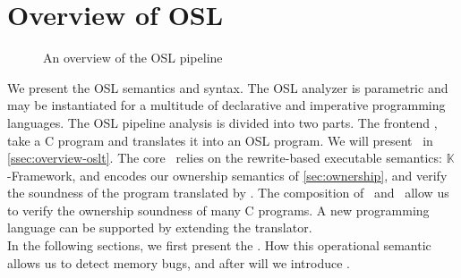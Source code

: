 \section{Overview of OSL}
\label{sec:osl-syntaxandsemantics}



\begin{wrapfigure}{l}{0.4\linewidth}
\centering
{}
\caption{An overview of the OSL pipeline}
\label{fig:my_label}
\end{wrapfigure}


We present the OSL semantics and syntax. The OSL analyzer is parametric and may be instantiated for a multitude of declarative and imperative programming languages. The OSL pipeline analysis is divided into two parts. The frontend \oslt, take a C program and translates it into an OSL program. We will present \oslt~in  \autoref{ssec:overview-oslt}. The core \oslos~relies on the rewrite-based executable semantics: ${\mathbb{K}}$-Framework, and encodes our ownership semantics of \autoref{sec:ownership}, and verify the soundness of the program translated by \oslt. The composition of  \oslos~and \oslt~allow us to verify the ownership soundness of many C programs. A new programming language can be supported by extending the translator. \\
In the following sections, we first present the \oslos. How this operational semantic allows us to detect memory bugs, and after will we introduce \oslt. 

